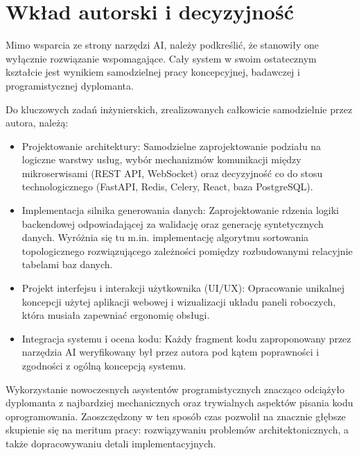 \section*{Wkład autorski i decyzyjność}

Mimo wsparcia ze strony narzędzi AI, należy podkreślić, że stanowiły one wyłącznie rozwiązanie wspomagające. Cały system w swoim ostatecznym kształcie jest wynikiem samodzielnej pracy koncepcyjnej, badawczej i programistycznej dyplomanta.

Do kluczowych zadań inżynierskich, zrealizowanych całkowicie samodzielnie przez autora, należą:
\begin{itemize}
    \item Projektowanie architektury: Samodzielne zaprojektowanie podziału na logiczne warstwy usług, wybór mechanizmów komunikacji między mikroserwisami (\gls{REST} \gls{API}, WebSocket) oraz decyzyjność co do stosu technologicznego (FastAPI, Redis, Celery, React, baza PostgreSQL).
    \item Implementacja silnika generowania danych: Zaprojektowanie rdzenia logiki backendowej odpowiadającej za walidację oraz generację syntetycznych danych. Wyróżnia się tu m.in. implementację algorytmu sortowania topologicznego rozwiązującego zależności pomiędzy rozbudowanymi relacyjnie tabelami baz danych.
    \item Projekt interfejsu i interakcji użytkownika (\gls{UI}/\gls{UX}): Opracowanie unikalnej koncepcji użytej aplikacji webowej i wizualizacji układu paneli roboczych, która musiała zapewniać ergonomię obsługi.
    \item Integracja systemu i ocena kodu: Każdy fragment kodu zaproponowany przez narzędzia AI weryfikowany był przez autora pod kątem poprawności i zgodności z ogólną koncepcją systemu.
\end{itemize}

Wykorzystanie nowoczesnych asystentów programistycznych znacząco odciążyło dyplomanta z najbardziej mechanicznych oraz trywialnych aspektów pisania kodu oprogramowania. Zaoszczędzony w ten sposób czas pozwolił na znacznie głębsze skupienie się na meritum pracy: rozwiązywaniu problemów architektonicznych, a także dopracowywaniu detali implementacyjnych.
